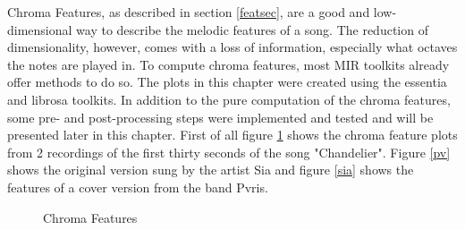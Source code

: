 Chroma Features, as described in section \ref{featsec}, are a good and low-dimensional way to describe the melodic features of a song. The reduction of dimensionality, however, comes with a loss of information, especially what octaves the notes are played in. To compute chroma features, most MIR toolkits already offer methods to do so. The plots in this chapter were created using the essentia \cite{essentia1} and librosa \cite{librosa1} toolkits. 
In addition to the pure computation of the chroma features, some pre- and post-processing steps were implemented and tested and will be presented later in this chapter. 
First of all figure \ref{fig:chroma1} shows the chroma feature plots from 2 recordings of the first thirty seconds of the song "Chandelier". Figure \ref{pv} shows the original version sung by the artist Sia and figure \ref{sia} shows the features of a cover version from the band Pvris. 
\begin{figure}[htbp]
	\centering
	\caption{Chroma Features}
	\label{fig:chroma1}
\end{figure}
